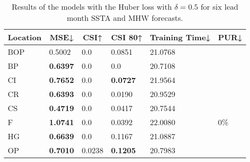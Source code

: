 \documentclass[11pt, a4paper]{article}
\begin{document}
\begin{table}[H]
\centering
\small
\caption{Results of the models with the Huber loss with $\delta=0.5$ for six lead month SSTA and MHW forecasts.}
\begin{tabular}{llllll}
\multicolumn{1}{c}{\textbf{Location}} & \multicolumn{1}{c}{\textbf{MSE↓}} & \multicolumn{1}{c}{\textbf{CSI↑}} & \multicolumn{1}{c}{\textbf{CSI 80↑}} & \multicolumn{1}{c}{\textbf{Training Time↓}} & \multicolumn{1}{c}{\textbf{PUR↓}} \\ \hline
BOP                         & 0.5002                            & 0.0                               & 0.0851                               & 21.0768                                     &                                   \\
BP                        & \textbf{0.6397}                   & 0.0                               & 0.0                                  & 20.7108                                     &                                   \\
CI                        & \textbf{0.7652}                   & 0.0                               & \textbf{0.0727}                      & 21.9564                                     &                                   \\
CR                           & \textbf{0.6393}                   & 0.0                               & 0.0190                               & 20.9529                                     &                                   \\
CS                           & \textbf{0.4719}                   & 0.0                               & 0.0417                               & 20.7544                                     &                                   \\
F                             & \textbf{1.0741}                   & 0.0                               & 0.0392                               & 22.0080                                     & 0\%                               \\
HG                          & \textbf{0.6639}                   & 0.0                               & 0.1167                               & 21.0887                                     &                                   \\
OP                       & \textbf{0.7010}                   & 0.0238                            & \textbf{0.1205}                      & 20.7983                                     &                                   \\

\end{tabular}
\end{table}
\end{document}
